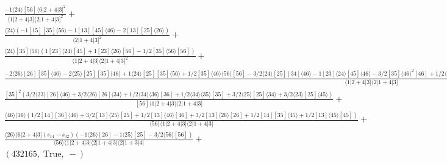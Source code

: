 \documentclass[varwidth, border=5pt]{standalone}
\begin{document}
\begin{my}
$\begin{gathered}
\scriptscriptstyle\frac{-1⟨24⟩[56]⟨6|2+4|3]^2}{⟨1|2+4|3]⟨2|1+4|3]^2}+\\
\scriptscriptstyle\frac{⟨24⟩(-1[15][35]⟨56⟩-1[13][45]⟨46⟩-2[13][25]⟨26⟩)}{⟨2|1+4|3]^2}+\\
\scriptscriptstyle\frac{⟨24⟩[35]⟨56⟩(1[23]⟨24⟩[45]+1[23]⟨26⟩[56]-1/2[35]⟨56⟩[56])}{⟨1|2+4|3]⟨2|1+4|3]^2}+\\
\scriptscriptstyle\frac{-2⟨26⟩[26][35]⟨46⟩-2⟨25⟩[25][35]⟨46⟩+1⟨24⟩[25][35]⟨56⟩+1/2[35]⟨46⟩⟨56⟩[56]-3/2⟨24⟩[25][34]⟨46⟩-1[23]⟨24⟩[45]⟨46⟩-3/2[35]⟨46⟩^2[46]+1/2⟨34⟩[35]^2⟨56⟩-3/2[35]⟨45⟩[45]⟨46⟩+1/2[23]⟨24⟩[25]⟨26⟩-3/2⟨34⟩[34][35]⟨46⟩+1[23]⟨26⟩⟨34⟩[35]}{⟨1|2+4|3]⟨2|1+4|3]}+\\
\scriptscriptstyle\frac{[35]^2(3/2⟨23⟩[26]⟨46⟩+3/2⟨26⟩[26]⟨34⟩+1/2⟨34⟩⟨36⟩[36]+1/2⟨34⟩⟨35⟩[35]+3/2⟨25⟩[25]⟨34⟩+3/2⟨23⟩[25]⟨45⟩)}{[56]⟨1|2+4|3]⟨2|1+4|3]}+\\
\scriptscriptstyle\frac{⟨46⟩⟨16⟩(1/2[14][36]⟨46⟩+3/2[13]⟨25⟩[25]+1/2[13]⟨46⟩[46]+3/2[13]⟨26⟩[26]+1/2[14][35]⟨45⟩+1/2[13]⟨45⟩[45])}{⟨56⟩⟨1|2+4|3]⟨2|1+4|3]}+\\
\scriptscriptstyle\frac{⟨26⟩⟨6|2+4|3](s_{14}-s_{32})(-1⟨26⟩[26]-1⟨25⟩[25]-3/2⟨56⟩[56])}{⟨56⟩⟨1|2+4|3]⟨2|1+4|3]⟨2|1+3|4]}+\\
\scriptscriptstyle(432165,\;\text{True},\;-)\phantom{+}
\end{gathered}$
\end{my}
\end{document}
